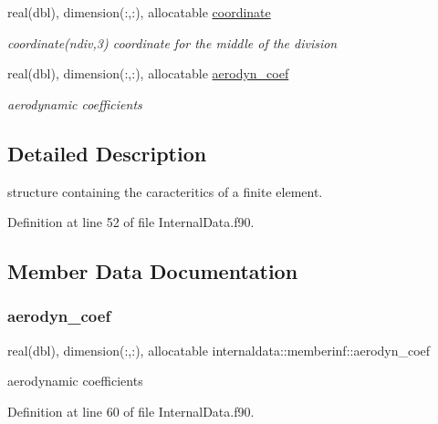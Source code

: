 \begin{DoxyCompactItemize}
real(dbl), dimension(\+:,\+:), allocatable \hyperlink{structinternaldata_1_1memberinf_aa467d076d70681ba6154b70aba9d957e}{coordinate}
\begin{DoxyCompactList}\small\item\em coordinate(ndiv,3) coordinate for the middle of the division \end{DoxyCompactList}\item 
real(dbl), dimension(\+:,\+:), allocatable \hyperlink{structinternaldata_1_1memberinf_aecd779a520e16b62e3d093885db7c5c4}{aerodyn\+\_\+coef}
\begin{DoxyCompactList}\small\item\em aerodynamic coefficients \end{DoxyCompactList}\end{DoxyCompactItemize}


\subsection{Detailed Description}
structure containing the caracteritics of a finite element. 

Definition at line 52 of file Internal\+Data.\+f90.



\subsection{Member Data Documentation}
\mbox{\label{structinternaldata_1_1memberinf_aecd779a520e16b62e3d093885db7c5c4}} 
\subsubsection{\texorpdfstring{aerodyn\+\_\+coef}{aerodyn\_coef}}
{\footnotesize\ttfamily real(dbl), dimension(\+:,\+:), allocatable internaldata\+::memberinf\+::aerodyn\+\_\+coef}



aerodynamic coefficients 



Definition at line 60 of file Internal\+Data.\+f90.

\mbox{\label{structinternaldata_1_1memberinf_aa467d076d70681ba6154b70aba9d957e}} 
